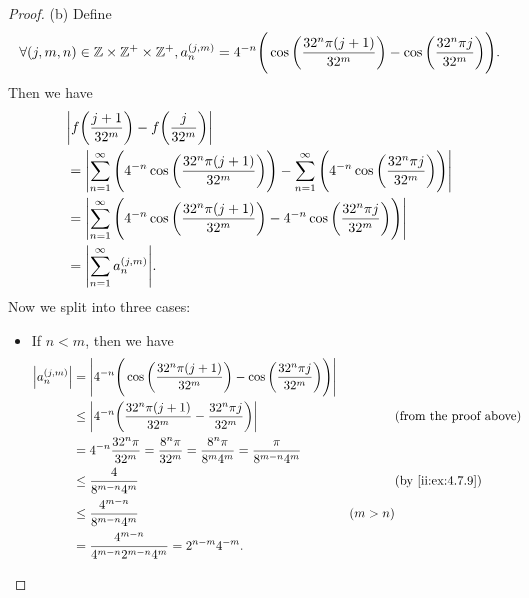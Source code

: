 \begin{proof}{(b)}
  Define
  \[
    \forall (j, m, n) \in \mathbb{Z} \times \mathbb{Z}^+ \times \mathbb{Z}^+, a_n^{(j, m)} = 4^{-n} \Bigg(\cos\bigg(\dfrac{32^n \pi (j + 1)}{32^m}\bigg) - \cos\bigg(\dfrac{32^n \pi j}{32^m}\bigg)\Bigg).
  \]
  Then we have
  \begin{align*}
     & \abs{f\bigg(\dfrac{j + 1}{32^m}\bigg) - f\bigg(\dfrac{j}{32^m}\bigg)}                                                                                                           \\
     & = \abs{\sum_{n = 1}^\infty \Bigg(4^{-n} \cos\bigg(\dfrac{32^n \pi (j + 1)}{32^m}\bigg)\Bigg) - \sum_{n = 1}^\infty \Bigg(4^{-n} \cos\bigg(\dfrac{32^n \pi j}{32^m}\bigg)\Bigg)} \\
     & = \abs{\sum_{n = 1}^\infty \Bigg(4^{-n} \cos\bigg(\dfrac{32^n \pi (j + 1)}{32^m}\bigg) - 4^{-n} \cos\bigg(\dfrac{32^n \pi j}{32^m}\bigg)\Bigg)}                                 \\
     & = \abs{\sum_{n = 1}^\infty a_n^{(j, m)}}.
  \end{align*}
  Now we split into three cases:
  \begin{itemize}
    \item If \(n < m\), then we have
          \begin{align*}
            \abs{a_n^{(j, m)}} & = \abs{4^{-n} \Bigg(\cos\bigg(\dfrac{32^n \pi (j + 1)}{32^m}\bigg) - \cos\bigg(\dfrac{32^n \pi j}{32^m}\bigg)\Bigg)}                                           \\
                               & \leq \abs{4^{-n} \bigg(\dfrac{32^n \pi (j + 1)}{32^m} - \dfrac{32^n \pi j}{32^m}\bigg)}                              &         & \text{(from the proof above)} \\
                               & = 4^{-n} \dfrac{32^n \pi}{32^m} = \dfrac{8^n \pi}{32^m} = \dfrac{8^n \pi}{8^m 4^m} = \dfrac{\pi}{8^{m - n} 4^m}                                                \\
                               & \leq \dfrac{4}{8^{m - n} 4^m}                                                                                        &         & \by{ii:ex:4.7.9}              \\
                               & \leq \dfrac{4^{m - n}}{8^{m - n} 4^m}                                                                                & (m > n)                                 \\
                               & = \dfrac{4^{m - n}}{4^{m - n} 2^{m - n} 4^m} = 2^{n - m} 4^{-m}.
          \end{align*}

\end{itemize}
\end{proof}
